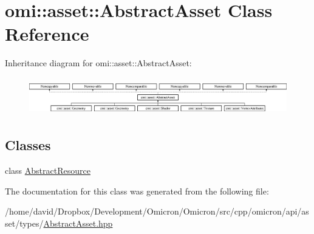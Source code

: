 \hypertarget{classomi_1_1asset_1_1_abstract_asset}{}\section{omi\+:\+:asset\+:\+:Abstract\+Asset Class Reference}
\label{classomi_1_1asset_1_1_abstract_asset}
Inheritance diagram for omi\+:\+:asset\+:\+:Abstract\+Asset\+:\begin{figure}[H]
\begin{center}
\leavevmode
\includegraphics[height=1.647059cm]{classomi_1_1asset_1_1_abstract_asset}
\end{center}
\end{figure}
\subsection*{Classes}
\begin{DoxyCompactItemize}
\item 
class \hyperlink{classomi_1_1asset_1_1_abstract_asset_1_1_abstract_resource}{Abstract\+Resource}
\end{DoxyCompactItemize}


The documentation for this class was generated from the following file\+:\begin{DoxyCompactItemize}
\item 
/home/david/\+Dropbox/\+Development/\+Omicron/\+Omicron/src/cpp/omicron/api/asset/types/\hyperlink{_abstract_asset_8hpp}{Abstract\+Asset.\+hpp}\end{DoxyCompactItemize}
